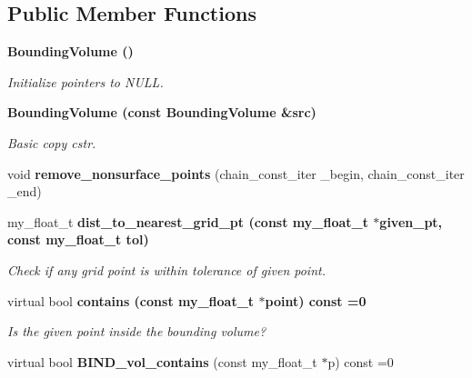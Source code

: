 \subsection*{Public Member Functions}
\begin{CompactItemize}
\item 
\bf{Bounding\-Volume} ()\label{classASCbase_1_1BoundingVolume_9fe70d0dcf235dd947304b1259e5dab3}

\begin{CompactList}\small\item\em Initialize pointers to NULL. \item\end{CompactList}\item 
\bf{Bounding\-Volume} (const \bf{Bounding\-Volume} \&src)\label{classASCbase_1_1BoundingVolume_460f07f7011383ee3bde18324fb216d8}

\begin{CompactList}\small\item\em Basic copy cstr. \item\end{CompactList}\item 
void \textbf{remove\_\-nonsurface\_\-points} (chain\_\-const\_\-iter \_\-begin, chain\_\-const\_\-iter \_\-end)\label{classASCbase_1_1BoundingVolume_7a552d8708eddcb0eb4b8af247eed3f3}

\item 
my\_\-float\_\-t \bf{dist\_\-to\_\-nearest\_\-grid\_\-pt} (const my\_\-float\_\-t $\ast$given\_\-pt, const my\_\-float\_\-t tol)\label{classASCbase_1_1BoundingVolume_29b827ac0631889832a23a6c3ccd73ad}

\begin{CompactList}\small\item\em Check if any grid point is within tolerance of given point. \item\end{CompactList}\item 
virtual bool \bf{contains} (const my\_\-float\_\-t $\ast$point) const =0\label{classASCbase_1_1BoundingVolume_4845f90aaeb0bdda5a7bab8ad69f249a}

\begin{CompactList}\small\item\em Is the given point inside the bounding volume? \item\end{CompactList}\item 
virtual bool \textbf{BIND\_\-vol\_\-contains} (const my\_\-float\_\-t $\ast$p) const =0\label{classASCbase_1_1BoundingVolume_fac13641d7742a874bdf8fc12bde2183}


\end{CompactItemize}
